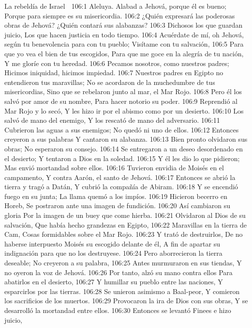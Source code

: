 La rebeldía de Israel 

106:1 Aleluya. 
Alabad a Jehová, porque él es bueno; 
Porque para siempre es su misericordia. 
106:2 ¿Quién expresará las poderosas obras de Jehová? 
¿Quién contará sus alabanzas? 
106:3 Dichosos los que guardan juicio, 
Los que hacen justicia en todo tiempo. 
106:4 Acuérdate de mí, oh Jehová, según tu benevolencia para con tu pueblo; 
Visítame con tu salvación, 
106:5 Para que yo vea el bien de tus escogidos, 
Para que me goce en la alegría de tu nación, 
Y me gloríe con tu heredad. 
106:6 Pecamos nosotros, como nuestros padres; 
Hicimos iniquidad, hicimos impiedad. 
106:7 Nuestros padres en Egipto no entendieron tus maravillas; 
No se acordaron de la muchedumbre de tus misericordias, 
Sino que se rebelaron junto al mar, el Mar Rojo. 
106:8 Pero él los salvó por amor de su nombre, 
Para hacer notorio su poder. 
106:9 Reprendió al Mar Rojo y lo secó, 
Y les hizo ir por el abismo como por un desierto. 
106:10 Los salvó de mano del enemigo, 
Y los rescató de mano del adversario. 
106:11 Cubrieron las aguas a sus enemigos; 
No quedó ni uno de ellos. 
106:12 Entonces creyeron a sus palabras 
Y cantaron su alabanza. 
106:13 Bien pronto olvidaron sus obras; 
No esperaron su consejo. 
106:14 Se entregaron a un deseo desordenado en el desierto; 
Y tentaron a Dios en la soledad. 
106:15 Y él les dio lo que pidieron; 
Mas envió mortandad sobre ellos. 
106:16 Tuvieron envidia de Moisés en el campamento, 
Y contra Aarón, el santo de Jehová. 
106:17 Entonces se abrió la tierra y tragó a Datán, 
Y cubrió la compañía de Abiram. 
106:18 Y se encendió fuego en su junta; 
La llama quemó a los impíos. 
106:19 Hicieron becerro en Horeb, 
Se postraron ante una imagen de fundición. 
106:20 Así cambiaron su gloria 
Por la imagen de un buey que come hierba. 
106:21 Olvidaron al Dios de su salvación, 
Que había hecho grandezas en Egipto, 
106:22 Maravillas en la tierra de Cam, 
Cosas formidables sobre el Mar Rojo. 
106:23 Y trató de destruirlos, 
De no haberse interpuesto Moisés su escogido delante de él, 
A fin de apartar su indignación para que no los destruyese. 
106:24 Pero aborrecieron la tierra deseable; 
No creyeron a su palabra, 
106:25 Antes murmuraron en sus tiendas, 
Y no oyeron la voz de Jehová. 
106:26 Por tanto, alzó su mano contra ellos 
Para abatirlos en el desierto, 
106:27 Y humillar su pueblo entre las naciones, 
Y esparcirlos por las tierras. 
106:28 Se unieron asimismo a Baal-peor, 
Y comieron los sacrificios de los muertos. 
106:29 Provocaron la ira de Dios con sus obras, 
Y se desarrolló la mortandad entre ellos. 
106:30 Entonces se levantó Finees e hizo juicio, 
